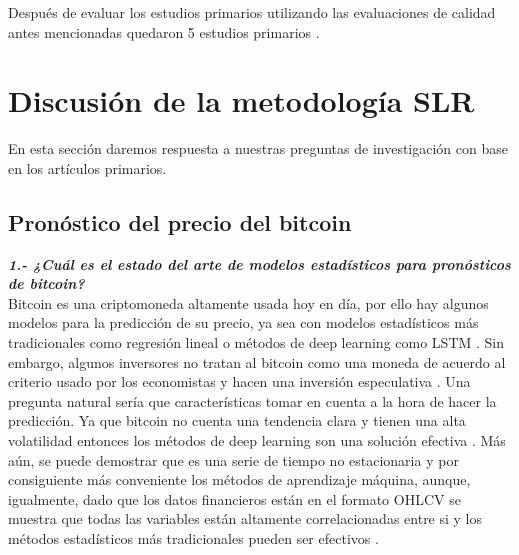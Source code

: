 Después de evaluar los estudios primarios utilizando las evaluaciones de calidad antes mencionadas quedaron 5 estudios primarios \parencite{ibrahimPredictingMarketMovement2021,jaquartShorttermBitcoinMarket2021,chenBitcoinPricePrediction2020,akyildirimPredictionCryptocurrencyReturns2021,pintelasInvestigatingProblemCryptocurrency2020}.

\section{Discusión de la metodología SLR}
En esta sección daremos respuesta a nuestras preguntas de investigación con base en los artículos primarios.

\subsection{Pronóstico del precio del bitcoin}

\textbf{\textit{1.- ¿Cuál es el estado del arte de modelos estadísticos para pronósticos de bitcoin?}}\\
Bitcoin es una criptomoneda altamente usada hoy en día, por ello hay algunos modelos para la predicción de su precio, ya sea con modelos estadísticos más tradicionales como regresión lineal o métodos de deep learning como LSTM \parencite{tandonBitcoinPriceForecasting2019}. Sin embargo, algunos inversores no tratan al bitcoin como una moneda de acuerdo al criterio usado por los economistas y hacen una inversión especulativa \parencite{chenBitcoinPricePrediction2020}. Una pregunta natural sería que características tomar en cuenta a la hora de hacer la predicción. Ya que bitcoin no cuenta una tendencia clara y tienen una alta volatilidad entonces los métodos de deep learning son una solución efectiva \parencite{tandonBitcoinPriceForecasting2019}. Más aún, se puede demostrar que es una serie de tiempo no estacionaria \parencite{mudassirTimeseriesForecastingBitcoin2020} y por consiguiente más conveniente los métodos de aprendizaje máquina, aunque, igualmente, dado que los datos financieros están en el formato OHLCV se muestra que todas las variables están altamente correlacionadas entre si y los métodos estadísticos más tradicionales pueden ser efectivos \parencite{phaladisailoedMachineLearningModels2018}.\\

